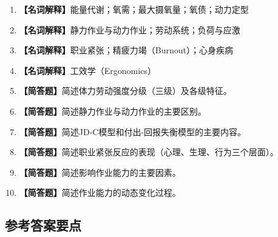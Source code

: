 \begin{enumerate}[leftmargin=*, itemsep=8pt]
    \item \textbf{【名词解释】}能量代谢；氧需；最大摄氧量；氧债；动力定型
    \item \textbf{【名词解释】}静力作业与动力作业；劳动系统；负荷与应激
    \item \textbf{【名词解释】}职业紧张；精疲力竭（Burnout）；心身疾病
    \item \textbf{【名词解释】}工效学（Ergonomics）
    \item \textbf{【简答题】}简述体力劳动强度分级（三级）及各级特征。
    \item \textbf{【简答题】}简述静力作业与动力作业的主要区别。
    \item \textbf{【简答题】}简述JD-C模型和付出-回报失衡模型的主要内容。
    \item \textbf{【简答题】}简述职业紧张反应的表现（心理、生理、行为三个层面）。
    \item \textbf{【简答题】}简述影响作业能力的主要因素。
    \item \textbf{【简答题】}简述作业能力的动态变化过程。
\end{enumerate}

\subsection*{参考答案要点}

